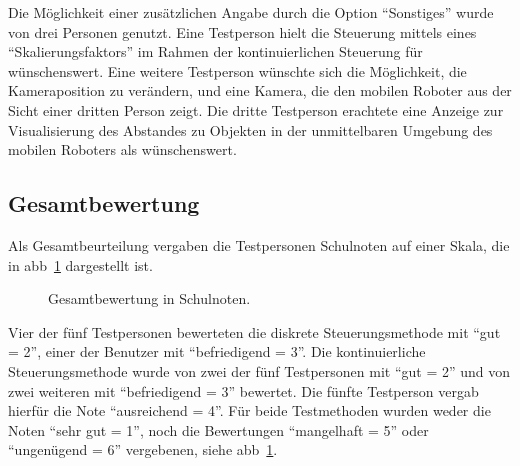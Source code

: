 Die Möglichkeit einer zusätzlichen Angabe durch die Option \enquote{Sonstiges} wurde von drei Personen genutzt.
Eine Testperson hielt die Steuerung mittels eines \enquote{Skalierungsfaktors} im Rahmen der kontinuierlichen Steuerung für wünschenswert. Eine weitere Testperson wünschte sich die Möglichkeit, die Kameraposition zu verändern, und eine Kamera, die den mobilen Roboter aus der Sicht einer dritten Person zeigt. Die dritte Testperson erachtete eine Anzeige zur Visualisierung des Abstandes zu Objekten in der unmittelbaren Umgebung des mobilen Roboters als wünschenswert.

\subsection{Gesamtbewertung}
Als Gesamtbeurteilung vergaben die Testpersonen Schulnoten auf einer Skala, die in \acs{abb}~\ref{fig:gesamtnoten} dargestellt ist.  
\begin{figure}[htb]
\begin{center}
\end{center}
\caption{Gesamtbewertung in Schulnoten.}
\label{fig:gesamtnoten}
\end{figure}

Vier der fünf Testpersonen bewerteten die diskrete Steuerungsmethode mit \enquote{gut = 2}, einer der Benutzer mit \enquote{befriedigend = 3}. Die kontinuierliche Steuerungsmethode wurde von zwei der fünf Testpersonen mit \enquote{gut = 2} und von zwei weiteren mit \enquote{befriedigend = 3} bewertet. Die fünfte Testperson vergab hierfür die Note \enquote{ausreichend = 4}. Für beide Testmethoden wurden weder die Noten \enquote{sehr gut = 1}, noch die Bewertungen \enquote{mangelhaft = 5} oder \enquote{ungenügend = 6} vergebenen, siehe \acs{abb}~\ref{fig:gesamtnoten}.

